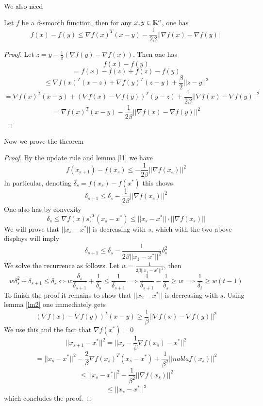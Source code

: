 We also need 

\begin{lemma} \label{lm2}
Let $f$ be a $\beta$-smooth function, then for any $x,y \in \mathbb{R}^n$, one has 
$$f(x) - f(y)\leq \nabla f(x)^T(x-y) - \frac{1}{2\beta}||\nabla f(x) - \nabla f(y)||$$
\end{lemma}

\begin{proof}
Let $z = y - \frac{1}{\beta}(\nabla f(y) - \nabla f(x))$.  Then one has 
$$f(x) - f(y)$$
$$= f(x) - f(z) + f(z) - f(y)$$
$$\leq \nabla f(x)^T(x-z) + \nabla f(y)^T(z-y) + \frac{\beta}{2}||z-y||^2$$
$$= \nabla f(x)^T(x-y) + (\nabla f(x) - \nabla f(y))^T(y-z) + \frac{1}{2\beta}||\nabla f(x) - \nabla f(y)||^2$$
$$= \nabla f(x)^T(x-y) - \frac{1}{2\beta} ||\nabla f(x) - \nabla f(y)||^2$$
\end{proof}

Now we prove the theorem

\begin{proof}
By the update rule and lemma \ref{l1} we have 
$$f(x_{s+1}) - f(x_s) \leq -\frac{1}{2\beta}||\nabla f(x_s)||^2 $$ 
In particular, denoting $\delta_s = f(x_s) - f(x^*)$ this shows
$$\delta_{s+1} \leq \delta_s - \frac{1}{2\beta}||\nabla f(x_s)||^2 $$
One also has by convexity
$$\delta_s \leq \nabla f(x)s)^T(x_s - x^*) \leq ||x_s - x^*|| \cdot ||\nabla f(x_s)||$$
We will prove that $||x_s - x^*||$ is decreasing with $s$, which with the two above displays will imply 
$$\delta_{s+1}\leq \delta_s - \frac{1}{2\beta||x_1 - x^*||^2}\delta_s^2$$
We solve the recurrence as follows.  Let $w = \frac{1}{2\beta||x_1 - x^*||^2}$, then 
$$w\delta_s^2 + \delta_{s+1} \leq \delta_s \iff w\frac{\delta_s}{\delta_{s+1}} + \frac
{1}{\delta_s} \leq \frac{1}{\delta_{s+1}} \implies \frac{1}{\delta_{s+1}} - \frac{1}{\delta_s} \geq w \implies \frac{1}{\delta_t} \geq w(t-1)$$
To finish the proof it remains to show that $||x_2 - x^*||$ is decreasing with $s$.  Using lemma \ref{lm2} one immediately gets 
$$ (\nabla f(x) - \nabla f(y))^T(x - y) \geq \frac{1}{\beta} ||\nabla f(x) - \nabla f(y)||^2$$
We use this and the fact that $\nabla f(x^*) = 0$
$$||x_{s+1} - x^*||^2 = ||x_s - \frac{1}{\beta}\nabla f(x_s) - x^*||^2$$
$$= ||x_s - x^*||^2 - \frac{2}{\beta}\nabla f(x_s)^T(x_s - x^*) + \frac{1}{\beta^2}||nabla f(x_s)||^2 $$
$$\leq ||x_s - x^*||^2 - \frac{1}{\beta^2} ||\nabla f(x_s)||^2 $$
$$\leq ||x_s - x^*||^2$$
which concludes the proof.  
\end{proof}

